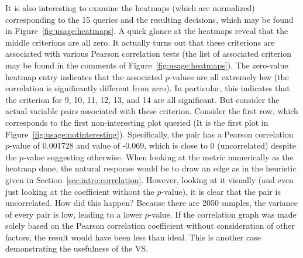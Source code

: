 It is also interesting to examine the heatmaps (which are normalized) 
corresponding to the 15 queries and the resulting decisions, which may be found 
in Figure~\ref{fig:usage:heatmaps}. A quick glance at the heatmaps reveal that 
the middle criterions are all zero. It actually turns out that these criterions 
are associated with various Pearson correlation tests (the list of associated 
criterion may be found in the comments of Figure~\ref{fig:usage:heatmaps}). 
The zero-value heatmap entry indicates that the associated $p$-values are all 
extremely low (the correlation is significantly different from zero). In 
particular, this indicates that the criterion for 9, 10, 11, 12, 13, and 14 are 
all significant. But consider the actual variable pairs associated with these 
criterion. Consider the first row, which corresponds to the first 
non-interesting plot queried (It is the first plot in 
Figure~\ref{fig:usage:notinteresting}). Specifically, the pair has a Pearson 
correlation $p$-value of 0.001728 and value of -0.069, which is close to 0 
(uncorrelated) despite the $p$-value suggesting otherwise. When looking at the 
metric numerically as the heatmap done, the natural response would be to draw 
an edge as in the heuristic given in Section~\ref{sec:intro:correlation}. 
However, looking at it visually (and even just looking at the coefficient 
without the $p$-value), it is clear that the pair is uncorrelated. How did this 
happen? Because there are 2050 samples, the variance of every pair is low, 
leading to a lower $p$-value. If the correlation graph was made solely based on 
the Pearson correlation coefficient without consideration of other factors, the 
result would have been less than ideal. This is another case demonstrating the 
usefulness of the VS.

